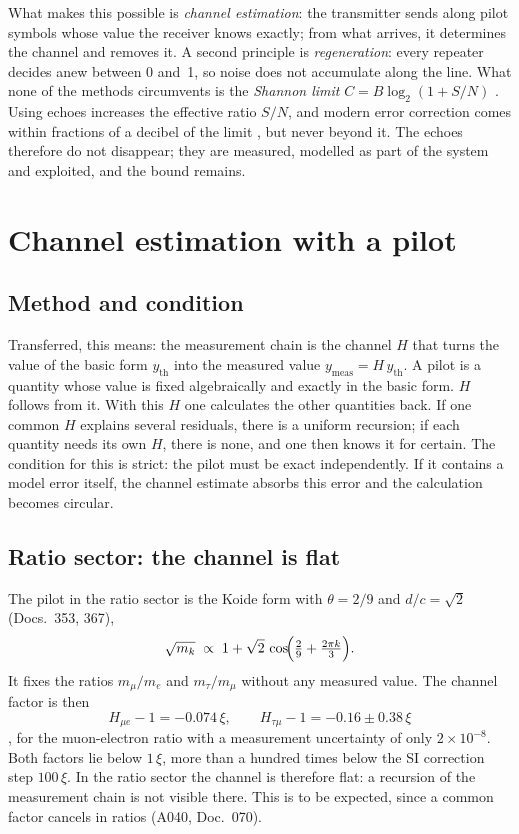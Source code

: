 What makes this possible is \emph{channel estimation}: the transmitter sends along pilot symbols whose
value the receiver knows exactly; from what arrives, it determines the channel and removes it. A second
principle is \emph{regeneration}: every repeater decides anew between 0 and~1, so noise does not
accumulate along the line. What none of the methods circumvents is the \emph{Shannon limit}
$C=B\log_2(1+S/N)$ \cite{Shannon1948}. Using echoes increases the effective ratio $S/N$, and modern
error correction comes within fractions of a decibel of the limit \cite{Berrou1993,Arikan2009}, but
never beyond it. The echoes therefore do not disappear; they are measured, modelled as part of the
system and exploited, and the bound remains.

\section{Channel estimation with a pilot}

\subsection{Method and condition}

Transferred, this means: the measurement chain is the channel $H$ that turns the value of the basic
form $y_{\text{th}}$ into the measured value $y_{\text{meas}}=H\,y_{\text{th}}$. A pilot is a quantity
whose value is fixed algebraically and exactly in the basic form. $H$ follows from it. With this $H$
one calculates the other quantities back. If one common $H$ explains several residuals, there is a
uniform recursion; if each quantity needs its own $H$, there is none, and one then knows it for
certain. The condition for this is strict: the pilot must be exact independently. If it contains a
model error itself, the channel estimate absorbs this error and the calculation becomes circular.

\subsection{Ratio sector: the channel is flat}

The pilot in the ratio sector is the Koide form with $\theta=2/9$ and $d/c=\sqrt2$ (Docs.~353, 367),
\begin{equation}
  \sqrt{m_k}\;\propto\;1+\sqrt2\,\cos\!\Bigl(\tfrac29+\tfrac{2\pi k}{3}\Bigr).
\end{equation}
It fixes the ratios $m_\mu/m_e$ and $m_\tau/m_\mu$ without any measured value. The channel factor is
then
\begin{equation}
  H_{\mu e}-1=-0.074\,\xi,\qquad H_{\tau\mu}-1=-0.16\pm0.38\,\xi
\end{equation}
\KM, for the muon-electron ratio with a measurement uncertainty of only $2\times10^{-8}$. Both factors
lie below $1\,\xi$, more than a hundred times below the SI correction step $100\,\xi$. In the ratio
sector the channel is therefore flat: a recursion of the measurement chain is not visible there. This
is to be expected, since a common factor cancels in ratios (A040, Doc.~070).

